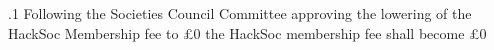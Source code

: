 .1 Following the Societies Council Committee approving the lowering of the HackSoc Membership fee to \pounds0 the HackSoc membership fee shall become \pounds0
